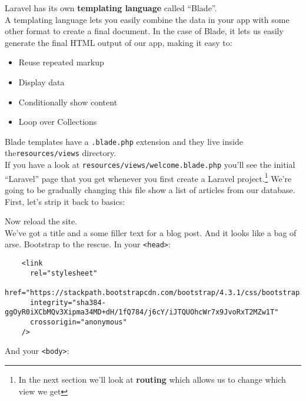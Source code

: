 Laravel has its own \textbf{templating language} called ``Blade''.
\\

A templating language lets you easily combine the data in your app with some other format to create a final document. In the case of Blade, it lets us easily generate the final HTML output of our app, making it easy to:
\\

\begin{itemize}
    \item Reuse repeated markup
    \item Display data
    \item Conditionally show content
    \item Loop over Collections
\end{itemize}

Blade templates have a \texttt{.blade.php} extension and they live inside the\texttt{resources/views} directory.
\\

If you have a look at \texttt{resources/views/welcome.blade.php} you'll see the initial ``Laravel'' page that you get whenever you first create a Laravel project.\footnote{In the next section we'll look at \textbf{routing} which allows us to change which view we get} We're going to be gradually changing this file show a list of articles from our database.
\\

First, let's strip it back to basics:


Now reload the site.
\\

We've got a title and a some filler text for a blog post. And it looks like a bag of arse. Bootstrap to the rescue. In your \texttt{<head>}:

\begin{verbatim}
    <link
      rel="stylesheet"
      href="https://stackpath.bootstrapcdn.com/bootstrap/4.3.1/css/bootstrap.min.css"
      integrity="sha384-ggOyR0iXCbMQv3Xipma34MD+dH/1fQ784/j6cY/iJTQUOhcWr7x9JvoRxT2MZw1T"
      crossorigin="anonymous"
    />
\end{verbatim}

And your \texttt{<body>}:


